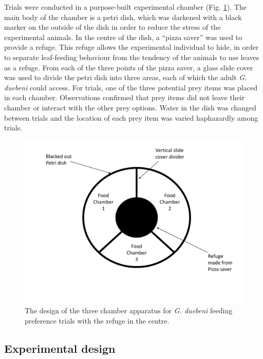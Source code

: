 Trials were conducted in a purpose-built experimental chamber (Fig. \ref{fig:chamber}). The main body of the chamber is a petri dish, which was darkened with a black marker on the outside of the dish in order to reduce the stress of the experimental animals. In the centre of the dish, a “pizza saver” was used to provide a refuge. This refuge allows the experimental individual to hide, in order to separate leaf-feeding behaviour from the tendency of the animals to use leaves as a refuge. From each of the three points of the pizza saver, a glass slide cover was used to divide the petri dish into three areas, each of which the adult \emph{G. duebeni} could access. For trials, one of the three potential prey items was placed in each chamber. Observations confirmed that prey items did not leave their chamber or interact with the other prey options. Water in the dish was changed between trials and the location of each prey item was varied haphazardly among trials.

\begin{figure}[H]
    \centering
    \includegraphics[scale=0.6]{figures/ch4/chamber.pdf}
    \vspace*{-1.5cm}
  \caption [Trial apparatus designed for \emph{G. duebeni} feeding preference trials]{The design of the three chamber apparatus for \emph{G. duebeni} feeding preference trials with the refuge in the centre.} 
    \label{fig:chamber}
\end{figure}


\subsection{Experimental design}

